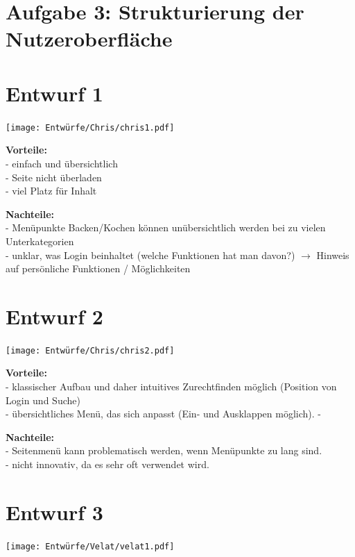 \documentclass[parskip,10pt,abstracton]{scrartcl}
\begin{document}
\section*{Aufgabe 3: Strukturierung der Nutzeroberfläche}


\section*{Entwurf 1} %

\texttt{[image: Entwürfe/Chris/chris1.pdf]}


\textbf{Vorteile:} \\
- einfach und übersichtlich\\
- Seite nicht überladen\\
- viel Platz für Inhalt

\textbf{Nachteile:} \\
- Menüpunkte Backen/Kochen können unübersichtlich werden bei zu vielen Unterkategorien\\
- unklar, was Login beinhaltet (welche Funktionen hat man davon?) $\to$ Hinweis auf persönliche Funktionen / Möglichkeiten

\section*{Entwurf 2} %

\texttt{[image: Entwürfe/Chris/chris2.pdf]}

\textbf{Vorteile:}\\
- klassischer Aufbau und daher intuitives Zurechtfinden möglich (Position von Login und Suche) \\
- übersichtliches Menü, das sich anpasst (Ein- und Ausklappen möglich).
-

\textbf{Nachteile:}\\
- Seitenmenü kann problematisch werden, wenn Menüpunkte zu lang sind.\\
- nicht innovativ, da es sehr oft verwendet wird.


\section*{Entwurf 3} %

\texttt{[image: Entwürfe/Velat/velat1.pdf]}
\end{document}
